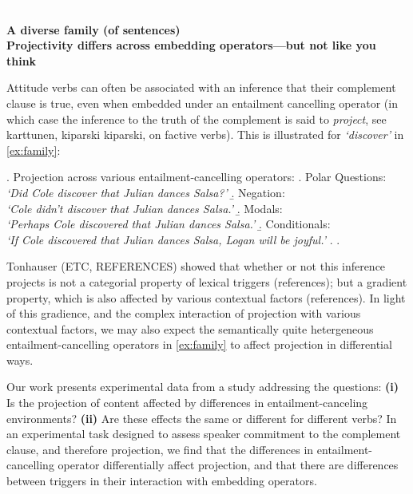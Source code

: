 \documentclass[12pt, a4paper]{scrartcl}
\begin{document}

\textcolor{white}{.} \vspace{-2.9\baselineskip} \\
\begin{center}
	\textbf{\large%
		A diverse family (of sentences)\\ Projectivity differs across embedding operators---but not like you think}
\end{center}
Attitude verbs can often be associated with an inference that their complement clause is true, even when embedded under an entailment cancelling operator (in which case the inference to the truth of the complement is said to \emph{project}, see karttunen, kiparski kiparski, on factive verbs). This is illustrated for \emph{\lq discover\rq} in \ref{ex:family}:

\ex. \label{ex:family} Projection across various entailment-cancelling operators:
	\a. Polar Questions:\\
		\emph{\lq Did Cole discover that Julian dances Salsa?\rq}
	\b. Negation:\\
		\emph{\lq Cole didn't discover that Julian dances Salsa.\rq}
	\b. Modals:\\
		\emph{\lq Perhaps Cole discovered that Julian dances Salsa.\rq}
	\b. Conditionals:\\
		\emph{\lq If Cole discovered that Julian dances Salsa, Logan will be joyful.\rq}
	\z.
\z.

Tonhauser (ETC, REFERENCES) showed that whether or not this inference projects is not a categorial property of lexical triggers (references); but a gradient property, which is also affected by various contextual factors (references). In light of this gradience, and the complex interaction of projection with various contextual factors, we may also expect the semantically quite hetergeneous entailment-cancelling operators in \ref{ex:family} to affect projection in differential ways.

Our work presents experimental data from a study addressing the questions: \textbf{(i)} Is the projection of content affected by differences in entailment-canceling environments? \textbf{(ii)} Are these effects the same or different for different verbs? In an experimental task designed to assess speaker commitment to the complement clause, and therefore projection, we find that the 
differences in entailment-cancelling operator differentially affect projection, and that there are differences between triggers in their interaction with embedding operators. 
\end{document}

